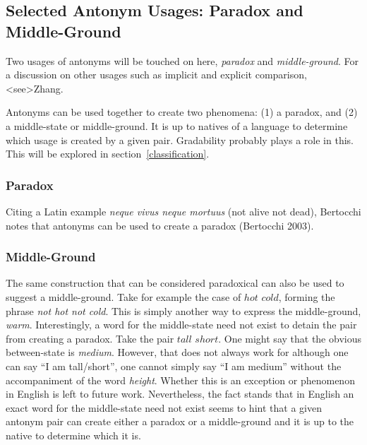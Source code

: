 \subsection {Selected Antonym Usages: Paradox and Middle-Ground} 
\label{usages}
Two usages of antonyms will be touched on here, \textit{paradox} and \textit{middle-ground}. For a discussion on other usages such as implicit and explicit comparison, \citeA<see>{Zhang}.  

Antonyms can be used together to create two phenomena: (1) a paradox, and (2) a middle-state or middle-ground.  It is up to natives of a language to determine which usage is created by a given pair.  Gradability probably plays a role in this.  This will be explored in section~\ref{classification}.

\subsubsection{Paradox}
Citing a Latin example \textit{neque vivus neque mortuus} (not alive not dead), Bertocchi notes that antonyms can be used to create a paradox (Bertocchi 2003).  

\subsubsection{Middle-Ground}
The same construction that can be considered paradoxical can also be used to suggest a middle-ground.  Take for example the case of $hot$ \opp $cold$, forming the phrase \textit{not hot not cold}.  This is simply another way to express the middle-ground, \textit{warm}.  Interestingly, a word for the middle-state need not exist to detain the pair from creating a paradox.  Take the pair $tall$ \opp $short$.  One might say that the obvious between-state is \textit{medium}.  However, that does not always work for although one can say ``I am tall/short'', one cannot simply say ``I am medium'' without the accompaniment of the word \textit{height}.  Whether this is an exception or phenomenon in English is left to future work.  Nevertheless, the fact stands that in English an exact word for the middle-state need not exist seems to hint that a given antonym pair can create either a paradox or a middle-ground and it is up to the native to determine which it is.  


